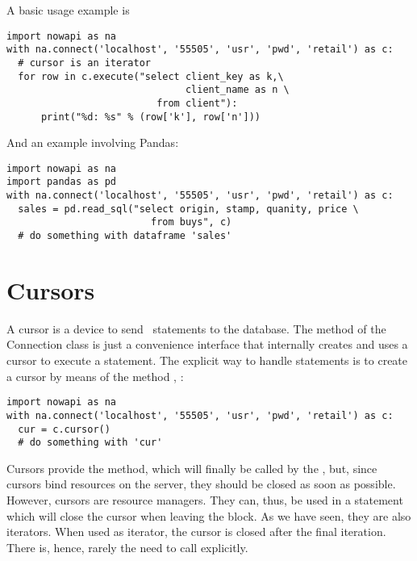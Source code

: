 A basic usage example is

\begin{python}
\begin{lstlisting}
import nowapi as na
with na.connect('localhost', '55505', 'usr', 'pwd', 'retail') as c:
  # cursor is an iterator
  for row in c.execute("select client_key as k,\
                               client_name as n \
                          from client"):
      print("%d: %s" % (row['k'], row['n']))
\end{lstlisting}
\end{python}

\begin{minipage}{\textwidth}
And an example involving Pandas:

\begin{python}
\begin{lstlisting}
import nowapi as na
import pandas as pd
with na.connect('localhost', '55505', 'usr', 'pwd', 'retail') as c:
  sales = pd.read_sql("select origin, stamp, quanity, price \
                         from buys", c)
  # do something with dataframe 'sales'
\end{lstlisting}
\end{python}
\end{minipage}

\section{Cursors}
A cursor is a device to send \sql\ statements to the database.
The  method of the Connection class is just a
convenience interface that internally creates and uses a
cursor to execute a statement. The explicit way to handle statements
is to create a cursor by means of the method \term{cursor}, \eg:

\begin{python}
\begin{lstlisting}
import nowapi as na
with na.connect('localhost', '55505', 'usr', 'pwd', 'retail') as c:
  cur = c.cursor()
  # do something with 'cur'
\end{lstlisting}
\end{python}

Cursors provide the  method, which
will finally be called by the ,
but, since cursors bind resources on the server,
they should be closed
as soon as possible.
However, cursors are resource managers.
They can, thus, be used in a  statement
which will close the cursor when leaving the block.
As we have seen, they are also iterators.
When used as iterator, the cursor is closed
after the final iteration.
There is, hence, rarely the need to call 
explicitly.


